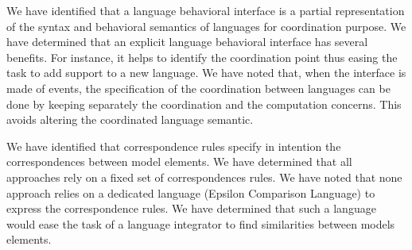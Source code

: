  
We have identified that a language behavioral interface is a partial representation of the syntax and behavioral semantics of languages for coordination purpose. We have determined that an explicit language behavioral interface has several benefits. For instance, it helps to identify the coordination point thus easing the task to add support to a new language. We have noted that, when the interface is made of events, the specification of the coordination between languages can be done by keeping separately the coordination and the computation concerns. This avoids altering the coordinated language semantic.


We have identified that correspondence rules specify in intention the correspondences between model elements. We have determined that all approaches rely on a fixed set of correspondences rules. We have noted that none approach relies on a dedicated language (\eg Epsilon Comparison Language) to express the correspondence rules. We have determined that such a language would ease the task of a language integrator to find similarities between models elements.  

